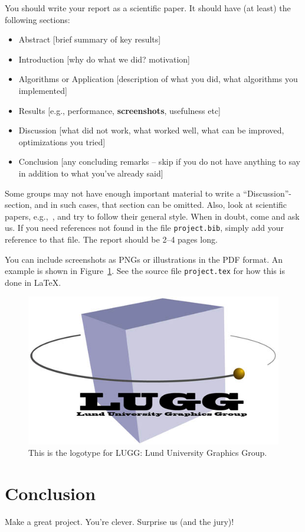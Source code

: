 \documentclass{acmsiggraph}               %
\begin{document}
You should write your report as a scientific paper. It should have (at least)
the following sections:
\begin{itemize}
    \item Abstract [brief summary of key results]
    \item Introduction [why do what we did? motivation]
    \item Algorithms or Application [description of what you did, what algorithms you implemented]
    \item Results [e.g., performance, \textbf{screenshots}, usefulness etc]
    \item Discussion [what did not work, what worked well, what can be improved, optimizations you tried]
    \item Conclusion [any concluding remarks -- skip if you do not have anything to say in addition to what you've already said]
\end{itemize}
Some groups may not have enough important material to write a ``Discussion''-section,
and in such cases, that section can be omitted. Also, look at scientific papers,
e.g.,~\cite{Hakura97,Igehy98,RaganKelley2011,Doggett2012,Ganestam2015}, and try to follow their general style.
When in doubt, come and ask us.
If you need references not found in the file \texttt{project.bib}, simply add your reference to
that file. The report should be 2--4 pages long.

You can include screenshots as PNGs or illustrations in the PDF format.
An example is shown in Figure~\ref{fig_lugg}. See the source file \texttt{project.tex}
for how this is done in \LaTeX.
\begin{figure}[tb]
    \centering
    \includegraphics[width=0.7\columnwidth]{lugg.png}
    \caption{This is the logotype for LUGG: Lund University Graphics Group.}
    \label{fig_lugg}
\end{figure}

\section{Conclusion}
Make a great project. You're clever. Surprise us (and the jury)!



\end{document}

